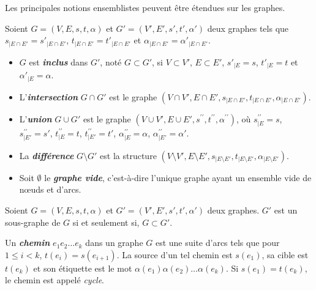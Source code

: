 Les principales notions ensemblistes peuvent être étendues sur les graphes.

\begin{definition}
	\label{def:graphe-notions-ensembles}
	Soient $G = (V,E,s,t,\alpha)$ et $G'=(V',E',s',t',\alpha')$ deux graphes tels que
	$s_{|E \cap E'} = s'_{|E \cap E'}$, $t_{|E \cap E'} = t'_{|E \cap E'}$ et
	$\alpha_{|E \cap E'} = \alpha'_{|E \cap E'}$.

	\begin{itemize}
		\item $G$ est \textbf{\emph{inclus}} dans $G'$, noté $G \subset G'$, si $V \subset V'$,
		      $E \subset E'$, $s'_{|E} = s$, $t'_{|E} = t$ et $\alpha'_{|E} = \alpha$.

		\item L'\textbf{\emph{intersection}} $G \cap G'$ est le graphe
		      $(V \cap V', E \cap E', s_{|E \cap E'}, t_{|E \cap E'}, \alpha_{|E \cap E'})$.

		\item L'\textbf{\emph{union}} $G \cup G'$ est le graphe
		      $(V \cup V', E \cup E', s^{\prime\prime}, t^{\prime\prime}, \alpha^{\prime\prime})$, où $s^{\prime\prime}_{|E} = s$,
		      $s^{\prime\prime}_{|E'} = s'$, $t^{\prime\prime}_{|E} = t$, $t^{\prime\prime}_{|E'} = t'$, $\alpha^{\prime\prime}_{|E} = \alpha$,
		      $\alpha^{\prime\prime}_{|E'} = \alpha'$.

		\item La \textbf{\emph{différence}} $G \setminus G'$ est la structure
		      $(V \setminus V', E \setminus E', s_{|E \setminus E'}, t_{|E \setminus E'}, \alpha_{|E \setminus E'})$.

		\item Soit $\emptyset$ le \textbf{\emph{graphe vide}}, c'est-à-dire l'unique graphe
		      ayant un ensemble vide de nœuds et d'arcs.
	\end{itemize}
\end{definition}

\begin{definition}
	\label{def:sous-graphe}
	Soient $G=(V,E,s,t,\alpha)$ et $G'=(V',E',s',t',\alpha')$ deux graphes. $G'$ est
	un sous-graphe de $G$ si et seulement si, $G \subset G'$.
\end{definition}

\begin{definition}[Chemin]
	\label{def:graphes-chemin}
	Un \textbf{\emph{chemin}} $e_{1}e_{2} \dots e_{k}$ dans un graphe $G$ est
	une suite d'arcs tels que pour $1 \leq i < k$, $t(e_{i}) = s(e_{i+1})$.
	La source d'un tel chemin est $s(e_{1})$, sa cible est $t(e_{k})$ et son
	étiquette est le mot $\alpha(e_{1}) \alpha(e_{2}) \dots \alpha(e_{k})$.
	Si $s(e_{1}) = t(e_{k})$, le chemin est appelé \emph{cycle}.
\end{definition}

